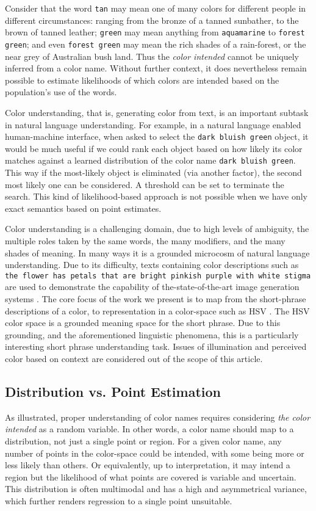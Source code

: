 Consider that the word \texttt{tan} may mean one of many colors for different people in different circumstances: ranging from the bronze of a tanned sunbather, to the brown of tanned leather;
\texttt{green} may mean anything from \texttt{aquamarine} to \texttt{forest green};
and even \texttt{forest green} may mean the rich shades of a rain-forest, or the near grey of Australian bush land.
Thus the \emph{color intended} cannot be uniquely inferred from a color name. Without further context, it does nevertheless remain possible to estimate likelihoods of which colors are intended based on the population's use of the words.

Color understanding, that is, generating color from text, is an important subtask in natural language understanding.
For example, in a natural language enabled human-machine interface, when asked to select the \texttt{dark bluish green} object, it would be much useful if we could rank each object based on how likely its color matches against a learned distribution of the color name \texttt{dark bluish green}. 
This way if the most-likely object is eliminated (via another factor), the second most likely one can be considered.
A threshold can be set to terminate the search.
This kind of likelihood-based approach is not possible when we have only exact semantics based on point estimates. 


Color understanding is a challenging domain, due to high levels of ambiguity, the multiple roles taken by the same words, the many modifiers, and the many shades of meaning.
In many ways it is a grounded microcosm of natural language understanding.
Due to its difficulty, texts containing color descriptions such as \texttt{the flower has petals that are bright pinkish purple with white stigma} are used to demonstrate the  capability of the-state-of-the-art image generation systems \parencite{reed2016generative, 2015arXiv151102793M}.
The core focus of the work we present is to map from the short-phrase descriptions of a color, to representation in a color-space such as HSV \parencite{smith1978color}.
The HSV color space is a grounded meaning space for the short phrase.
Due to this grounding, and the aforementioned linguistic phenomena, this is a particularly interesting short phrase understanding task.
Issues of illumination and perceived color based on context are considered out of the scope of this  article.

\subsection{Distribution vs. Point Estimation}
As illustrated, proper understanding of color names requires considering \emph{the color intended} as a random variable.
In other words, a color name should map to a distribution, not just a single point or region.
For a given color name, any number of points in the color-space could be intended, with some being more or less likely than others.
Or equivalently, up to interpretation, it may intend a region but the likelihood of what points are covered is variable and uncertain.
This distribution is often multimodal and has a high and asymmetrical variance, which further renders regression to a single point unsuitable.


